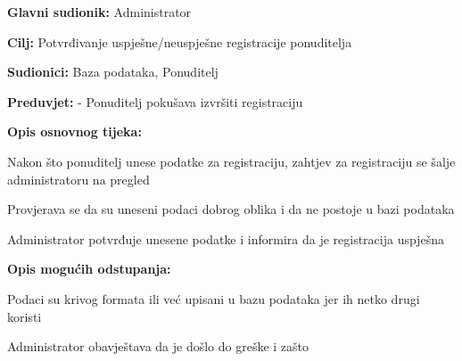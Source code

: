                     			\noindent {}
					\begin{packed_item}
	
						\item \textbf{Glavni sudionik: } Administrator
						\item  \textbf{Cilj:} Potvrđivanje uspješne/neuspješne registracije ponuditelja
						\item  \textbf{Sudionici:} Baza podataka, Ponuditelj
						\item  \textbf{Preduvjet:} - Ponuditelj pokušava izvršiti registraciju
						\item  \textbf{Opis osnovnog tijeka:}
						
						\item[] \begin{packed_enum}
	
							\item Nakon što ponuditelj unese podatke za registraciju, zahtjev za registraciju se šalje administratoru na pregled
							\item Provjerava se da su uneseni podaci dobrog oblika i da ne postoje u bazi podataka
                           				 \item Administrator potvrđuje unesene podatke i informira da je registracija uspješna
						\end{packed_enum}
						
						\item  \textbf{Opis mogućih odstupanja:}
						
						\item[] \begin{packed_item}
	
							\item[2.a] Podaci su krivog formata ili već upisani u bazu podataka jer ih netko drugi koristi
							\item[] \begin{packed_enum}			
								\item Administrator obavještava da je došlo do greške i zašto
							\end{packed_enum}
						\end{packed_item}
					\end{packed_item}

